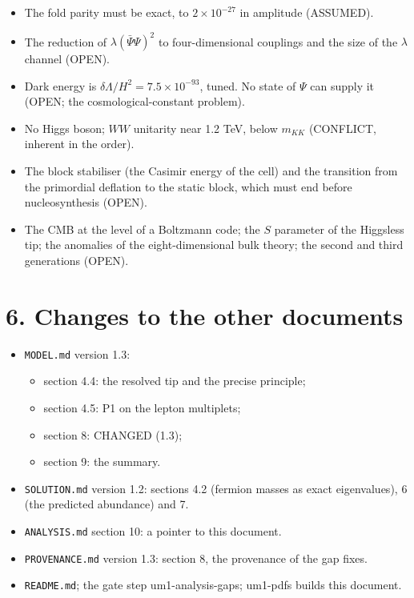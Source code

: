 \documentclass[11pt]{article}
\begin{document}
\begin{itemize}
\item The fold parity must be exact, to $2\times10^{-27}$ in amplitude (ASSUMED).
\item The reduction of $\lambda(\bar\Psi\Psi)^2$ to four-dimensional couplings and the size of the $\lambda$ channel (OPEN).
\item Dark energy is $\delta\Lambda/H^2 = 7.5\times10^{-93}$, tuned. No state of $\Psi$ can supply it (OPEN; the cosmological-constant problem).
\item No Higgs boson; $WW$ unitarity near 1.2 TeV, below $m_{KK}$ (CONFLICT, inherent in the order).
\item The block stabiliser (the Casimir energy of the cell) and the transition from the primordial deflation to the static block, which must end before nucleosynthesis (OPEN).
\item The CMB at the level of a Boltzmann code; the $S$ parameter of the Higgsless tip; the anomalies of the eight-dimensional bulk theory; the second and third generations (OPEN).
\end{itemize}

\section*{6. Changes to the other documents}

\begin{itemize}
\item \texttt{MODEL.\allowbreak{}md} version 1.3:
\begin{itemize}
\item section 4.4: the resolved tip and the precise principle;
\item section 4.5: P1 on the lepton multiplets;
\item section 8: CHANGED (1.3);
\item section 9: the summary.
\end{itemize}
\item \texttt{SOLUTION.\allowbreak{}md} version 1.2: sections 4.2 (fermion masses as exact eigenvalues), 6 (the predicted abundance) and 7.
\item \texttt{ANALYSIS.\allowbreak{}md} section 10: a pointer to this document.
\item \texttt{PROVENANCE.\allowbreak{}md} version 1.3: section 8, the provenance of the gap fixes.
\item \texttt{README.\allowbreak{}md}; the gate step um1-analysis-gaps; um1-pdfs builds this document.
\end{itemize}
\end{document}

